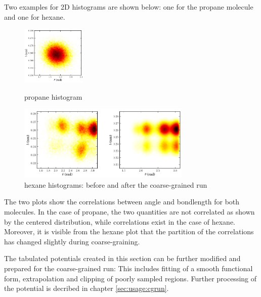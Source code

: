 Two examples for 2D histograms are shown below: one for the propane molecule and one for hexane.

\begin{figure}[h]
\hspace{1cm}
\begin{minipage}{4cm}
  \includegraphics[height=2.8cm]{fig/propane_hist2d}
  \caption{propane histogram}
  \label{boltzmann:propane}
\end{minipage}
\hfill
\begin{minipage}{10cm}
  \includegraphics[height=3.6cm]{fig/hexane2}
  \caption{hexane histograms: before and after the coarse-grained run}
  \label{boltzmann:hexane}
\end{minipage}
\end{figure}

The two plots show the correlations between angle and bondlength for both molecules. In the case of propane, the two quantities are not correlated as shown by the centered distribution, while correlations exist in the case of hexane. Moreover, it is visible from the hexane plot that the partition of the correlations has changed slightly during coarse-graining.

The tabulated potentials created in this section can be further modified and prepared for the coarse-grained run: This includes fitting of a smooth functional form, extrapolation and clipping of poorly sampled regions. Further processing of the potential is decribed in chapter \ref{sec:usage:cgrun}.
